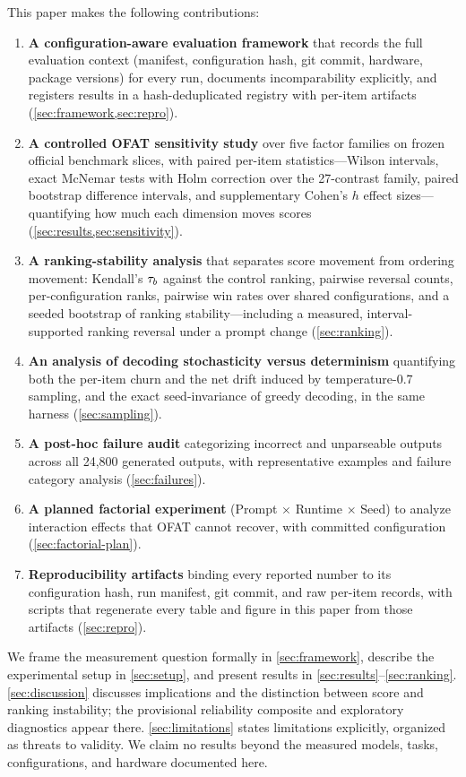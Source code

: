 This paper makes the following contributions:
\begin{enumerate}
  \item \textbf{A configuration-aware evaluation framework} that records the
  full evaluation context (manifest, configuration hash, git commit,
  hardware, package versions) for every run, documents incomparability
  explicitly, and registers results in a hash-deduplicated registry with
  per-item artifacts (\cref{sec:framework,sec:repro}).
  \item \textbf{A controlled OFAT sensitivity study} over five factor
  families on frozen official benchmark slices, with paired per-item
  statistics---Wilson intervals, exact McNemar tests with Holm correction
  over the 27-contrast family, paired bootstrap difference intervals, and
  supplementary Cohen's $h$ effect sizes---quantifying how much each dimension moves
  scores (\cref{sec:results,sec:sensitivity}).
  \item \textbf{A ranking-stability analysis} that separates score movement
  from ordering movement: Kendall's $\tau_b$ against the control ranking,
  pairwise reversal counts, per-configuration ranks, pairwise win rates over
  shared configurations, and a seeded bootstrap of ranking
  stability---including a measured, interval-supported ranking reversal
  under a prompt change (\cref{sec:ranking}).
  \item \textbf{An analysis of decoding stochasticity versus determinism}
  quantifying both the per-item churn and the net drift induced by
  temperature-0.7 sampling, and the exact seed-invariance of greedy
  decoding, in the same harness (\cref{sec:sampling}).
  \item \textbf{A post-hoc failure audit} categorizing incorrect and
  unparseable outputs across all 24,800 generated outputs, with
  representative examples and failure category analysis
  (\cref{sec:failures}).
  \item \textbf{A planned factorial experiment} (Prompt $\times$ Runtime
  $\times$ Seed) to analyze interaction effects that OFAT cannot recover,
  with committed configuration (\cref{sec:factorial-plan}).
  \item \textbf{Reproducibility artifacts} binding every reported number to
  its configuration hash, run manifest, git commit, and raw per-item
  records, with scripts that regenerate every table and figure in this
  paper from those artifacts (\cref{sec:repro}).
\end{enumerate}

We frame the measurement question formally in \cref{sec:framework}, describe
the experimental setup in \cref{sec:setup}, and present results in
\cref{sec:results}--\cref{sec:ranking}. \cref{sec:discussion} discusses
implications and the distinction between score and ranking instability; the
provisional reliability composite and exploratory diagnostics appear there.
\cref{sec:limitations} states limitations explicitly, organized as threats
to validity. We claim no results
beyond the measured models, tasks, configurations, and hardware documented
here.

